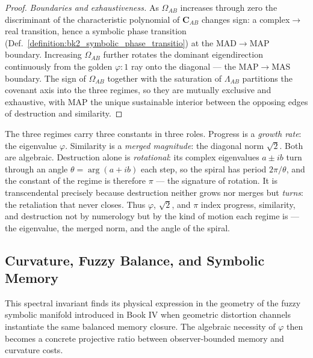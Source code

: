 \begin{proof}
\emph{Boundaries and exhaustiveness.} As $\Omega_{AB}$ increases through zero the discriminant of the characteristic polynomial of $\mathbf{C}_{AB}$ changes sign: a complex$\to$real transition, hence a symbolic phase transition (Def.~\ref{definition:bk2_symbolic_phase_transitio}) at the $\mathrm{MAD}\!\to\!\mathrm{MAP}$ boundary. Increasing $\Omega_{AB}$ further rotates the dominant eigendirection continuously from the golden $\varphi{:}1$ ray onto the diagonal --- the $\mathrm{MAP}\!\to\!\mathrm{MAS}$ boundary. The sign of $\Omega_{AB}$ together with the saturation of $\Lambda_{AB}$ partitions the covenant axis into the three regimes, so they are mutually exclusive and exhaustive, with MAP the unique sustainable interior between the opposing edges of destruction and similarity.
\end{proof}

\begin{scholium}
\label{scholium:bk5_pi_at_mad_edge}
The three regimes carry three constants in three roles. Progress is a \emph{growth rate}: the eigenvalue $\varphi$. Similarity is a \emph{merged magnitude}: the diagonal norm $\sqrt2$. Both are algebraic. Destruction alone is \emph{rotational}: its complex eigenvalues $a\pm ib$ turn through an angle $\theta=\arg(a+ib)$ each step, so the spiral has period $2\pi/\theta$, and the constant of the regime is therefore $\pi$ --- the signature of rotation. It is transcendental precisely because destruction neither grows nor merges but \emph{turns}: the retaliation that never closes. Thus $\varphi$, $\sqrt2$, and $\pi$ index progress, similarity, and destruction not by numerology but by the kind of motion each regime is --- the eigenvalue, the merged norm, and the angle of the spiral.
\end{scholium}

\subsection{Curvature, Fuzzy Balance, and Symbolic Memory}
\label{subsec:bk5_curvature_and_fuzzy_balance}

This spectral invariant finds its physical expression in the geometry of the fuzzy symbolic manifold introduced in Book IV when geometric distortion channels instantiate the same balanced memory closure. The algebraic necessity of $\varphi$ then becomes a concrete projective ratio between observer-bounded memory and curvature costs.


